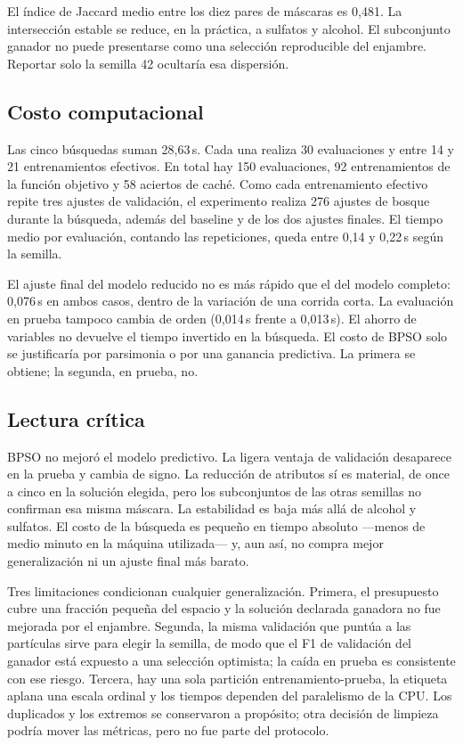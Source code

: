 \documentclass[conference]{IEEEtran}
\begin{document}
El índice de Jaccard medio entre los diez pares de máscaras es 0,481. La intersección estable se reduce, en la práctica, a sulfatos y alcohol. El subconjunto ganador no puede presentarse como una selección reproducible del enjambre. Reportar solo la semilla 42 ocultaría esa dispersión.

\subsection{Costo computacional}
Las cinco búsquedas suman 28,63\,s. Cada una realiza 30 evaluaciones y entre 14 y 21 entrenamientos efectivos. En total hay 150 evaluaciones, 92 entrenamientos de la función objetivo y 58 aciertos de caché. Como cada entrenamiento efectivo repite tres ajustes de validación, el experimento realiza 276 ajustes de bosque durante la búsqueda, además del baseline y de los dos ajustes finales. El tiempo medio por evaluación, contando las repeticiones, queda entre 0,14 y 0,22\,s según la semilla.

El ajuste final del modelo reducido no es más rápido que el del modelo completo: 0,076\,s en ambos casos, dentro de la variación de una corrida corta. La evaluación en prueba tampoco cambia de orden (0,014\,s frente a 0,013\,s). El ahorro de variables no devuelve el tiempo invertido en la búsqueda. El costo de BPSO solo se justificaría por parsimonia o por una ganancia predictiva. La primera se obtiene; la segunda, en prueba, no.

\subsection{Lectura crítica}
BPSO no mejoró el modelo predictivo. La ligera ventaja de validación desaparece en la prueba y cambia de signo. La reducción de atributos sí es material, de once a cinco en la solución elegida, pero los subconjuntos de las otras semillas no confirman esa misma máscara. La estabilidad es baja más allá de alcohol y sulfatos. El costo de la búsqueda es pequeño en tiempo absoluto ---menos de medio minuto en la máquina utilizada--- y, aun así, no compra mejor generalización ni un ajuste final más barato.

Tres limitaciones condicionan cualquier generalización. Primera, el presupuesto cubre una fracción pequeña del espacio y la solución declarada ganadora no fue mejorada por el enjambre. Segunda, la misma validación que puntúa a las partículas sirve para elegir la semilla, de modo que el F1 de validación del ganador está expuesto a una selección optimista; la caída en prueba es consistente con ese riesgo. Tercera, hay una sola partición entrenamiento-prueba, la etiqueta aplana una escala ordinal y los tiempos dependen del paralelismo de la CPU. Los duplicados y los extremos se conservaron a propósito; otra decisión de limpieza podría mover las métricas, pero no fue parte del protocolo.
\end{document}
